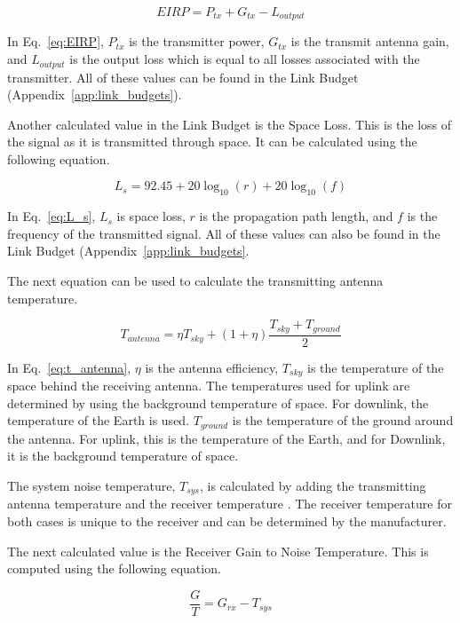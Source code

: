 \documentclass[12pt]{article}
\begin{document}
\begin{equation}\label{eq:EIRP}
EIRP = P_{tx} + G_{tx} - L_{output} 
\end{equation}

In Eq.~\ref{eq:EIRP}, $P_{tx}$ is the transmitter power, $G_{tx}$ is the transmit antenna gain, and $L_{output}$ is the output loss which is equal to all losses associated with the transmitter. All of these values can be found in the Link Budget (Appendix~\ref{app:link_budgets}).

Another calculated value in the Link Budget is the Space Loss. This is the loss of the signal as it is transmitted through space. It can be calculated \cite{SMAD} using the following equation.

\begin{equation}\label{eq:L_s}
L_s = 92.45 + 20\log_{10}(r) + 20\log_{10}(f) 
\end{equation}

In Eq.~\ref{eq:L_s}, $L_s$ is space loss, $r$ is the propagation path length, and $f$ is the frequency of the transmitted signal. All of these values can also be found in the Link Budget (Appendix~\ref{app:link_budgets}.

The next equation can be used to calculate \cite{pozar} the transmitting antenna temperature.

\begin{equation}\label{eq:t_antenna}
T_{antenna} = \eta T_{sky} + (1 + \eta) \frac{T_{sky} + T_{ground}}{2} 
\end{equation}

In Eq.~\ref{eq:t_antenna}, $\eta$ is the antenna efficiency, $T_{sky}$ is the temperature of the space behind the receiving antenna. The temperatures used for uplink are determined by using the background temperature of space. For downlink, the temperature of the Earth is used. $T_{ground}$ is the temperature of the ground around the antenna. For uplink, this is the temperature of the Earth, and for Downlink, it is the background temperature of space.

The system noise temperature, $T_{sys}$, is calculated by adding the transmitting antenna temperature and the receiver temperature \cite{pozar}. The receiver temperature for both cases is unique to the receiver and can be determined by the manufacturer.

The next calculated value is the Receiver Gain to Noise Temperature. This is computed \cite{SMAD} using the following equation.

\begin{equation}\label{eq:G/T}
\frac{G}{T} =  G_{rx} - T_{sys} 
\end{equation}
\end{document}
